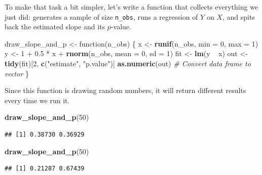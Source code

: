 \documentclass[12pt,oneside,openany]{book}
\newenvironment{Shaded}{\begin{snugshade}}{\end{snugshade}}
\newcommand{\KeywordTok}[1]{\textcolor[rgb]{0.13,0.29,0.53}{\textbf{{#1}}}}
\newcommand{\DataTypeTok}[1]{\textcolor[rgb]{0.13,0.29,0.53}{{#1}}}
\newcommand{\DecValTok}[1]{\textcolor[rgb]{0.00,0.00,0.81}{{#1}}}
\newcommand{\FloatTok}[1]{\textcolor[rgb]{0.00,0.00,0.81}{{#1}}}
\newcommand{\StringTok}[1]{\textcolor[rgb]{0.31,0.60,0.02}{{#1}}}
\newcommand{\CommentTok}[1]{\textcolor[rgb]{0.56,0.35,0.01}{\textit{{#1}}}}
\newcommand{\NormalTok}[1]{{#1}}
\begin{document}
To make that task a bit simpler, let's write a function that collects
everything we just did: generates a sample of size \texttt{n\_obs}, runs
a regression of \(Y\) on \(X\), and spits back the estimated slope and
its \(p\)-value.

\begin{Shaded}
\begin{Highlighting}[]
\NormalTok{draw_slope_and_p <-}\StringTok{ }\NormalTok{function(n_obs) \{}
    \NormalTok{x <-}\StringTok{ }\KeywordTok{runif}\NormalTok{(n_obs, }\DataTypeTok{min =} \DecValTok{0}\NormalTok{, }\DataTypeTok{max =} \DecValTok{1}\NormalTok{)}
    \NormalTok{y <-}\StringTok{ }\DecValTok{1} \NormalTok{+}\StringTok{ }\FloatTok{0.5} \NormalTok{*}\StringTok{ }\NormalTok{x +}\StringTok{ }\KeywordTok{rnorm}\NormalTok{(n_obs, }\DataTypeTok{mean =} \DecValTok{0}\NormalTok{, }\DataTypeTok{sd =} \DecValTok{1}\NormalTok{)}
    \NormalTok{fit <-}\StringTok{ }\KeywordTok{lm}\NormalTok{(y ~}\StringTok{ }\NormalTok{x)}
    \NormalTok{out <-}\StringTok{ }\KeywordTok{tidy}\NormalTok{(fit)[}\DecValTok{2}\NormalTok{, }\KeywordTok{c}\NormalTok{(}\StringTok{"estimate"}\NormalTok{, }\StringTok{"p.value"}\NormalTok{)]}
    \KeywordTok{as.numeric}\NormalTok{(out)  }\CommentTok{# Convert data frame to vector}
\NormalTok{\}}
\end{Highlighting}
\end{Shaded}

Since this function is drawing random numbers, it will return different
results every time we run it.

\begin{Shaded}
\begin{Highlighting}[]
\KeywordTok{draw_slope_and_p}\NormalTok{(}\DecValTok{50}\NormalTok{)}
\end{Highlighting}
\end{Shaded}

\begin{verbatim}
## [1] 0.38730 0.36929
\end{verbatim}

\begin{Shaded}
\begin{Highlighting}[]
\KeywordTok{draw_slope_and_p}\NormalTok{(}\DecValTok{50}\NormalTok{)}
\end{Highlighting}
\end{Shaded}

\begin{verbatim}
## [1] 0.21287 0.67439
\end{verbatim}
\end{document}
